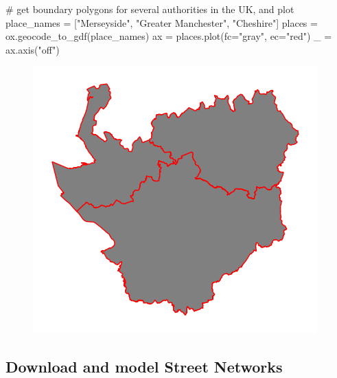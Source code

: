 \documentclass[
  letterpaper,
  DIV=11,
  numbers=noendperiod]{scrreprt}
\newenvironment{Shaded}{\begin{snugshade}}{\end{snugshade}}
\newcommand{\CommentTok}[1]{\textcolor[rgb]{0.37,0.37,0.37}{#1}}
\newcommand{\NormalTok}[1]{\textcolor[rgb]{0.00,0.23,0.31}{#1}}
\newcommand{\OperatorTok}[1]{\textcolor[rgb]{0.37,0.37,0.37}{#1}}
\newcommand{\StringTok}[1]{\textcolor[rgb]{0.13,0.47,0.30}{#1}}
\begin{document}
\begin{Shaded}
\begin{Highlighting}[]
\CommentTok{\# get boundary polygons for several authorities in the UK, and plot}
\NormalTok{place\_names }\OperatorTok{=}\NormalTok{ [}\StringTok{"Merseyside"}\NormalTok{, }\StringTok{"Greater Manchester"}\NormalTok{, }\StringTok{"Cheshire"}\NormalTok{]}
\NormalTok{places }\OperatorTok{=}\NormalTok{ ox.geocode\_to\_gdf(place\_names)}
\NormalTok{ax }\OperatorTok{=}\NormalTok{ places.plot(fc}\OperatorTok{=}\StringTok{"gray"}\NormalTok{, ec}\OperatorTok{=}\StringTok{"red"}\NormalTok{)}
\NormalTok{\_ }\OperatorTok{=}\NormalTok{ ax.axis(}\StringTok{"off"}\NormalTok{)}
\end{Highlighting}
\end{Shaded}

\begin{figure}[H]

{\centering \includegraphics{labs/w07_OSM_files/figure-pdf/cell-5-output-1.png}

}

\end{figure}

\hypertarget{download-and-model-street-networks}{%
\subsection{Download and model Street
Networks}\label{download-and-model-street-networks}}
\end{document}

